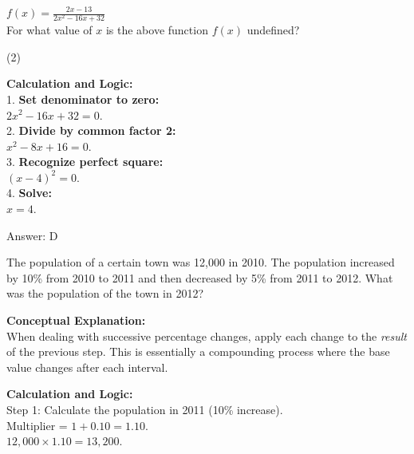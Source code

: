 \documentclass[11pt,paper=a4,answers]{exam}
\begin{document}
\begin{questions}
\vspace{60pt}

\question
$f(x) = \frac{2x - 13}{2x^2 - 16x + 32}$ \\
For what value of $x$ is the above function $f(x)$ undefined?
\begin{tasks}(2)
\end{tasks}

\begin{solution}
\textbf{Calculation and Logic:} \\
1. \textbf{Set denominator to zero:} \\
   $2x^2 - 16x + 32 = 0$. \\
2. \textbf{Divide by common factor 2:} \\
   $x^2 - 8x + 16 = 0$. \\
3. \textbf{Recognize perfect square:} \\
   $(x - 4)^2 = 0$. \\
4. \textbf{Solve:} \\
   $x = 4$.

\vspace{30pt}

Answer: \colorbox{yellow!100}{D}
\end{solution}


\question
The population of a certain town was 12,000 in 2010. The population increased by 10\% from 2010 to 2011 and then decreased by 5\% from 2011 to 2012. What was the population of the town in 2012?

\begin{solution}
\textbf{Conceptual Explanation:} \\
When dealing with successive percentage changes, apply each change to the \textit{result} of the previous step. This is essentially a compounding process where the base value changes after each interval.

\vspace{30pt}

\textbf{Calculation and Logic:} \\
Step 1: Calculate the population in 2011 (10\% increase). \\
Multiplier = $1 + 0.10 = 1.10$. \\
$12,000 \times 1.10 = 13,200$.


\end{solution}
\end{questions}
\end{document}
